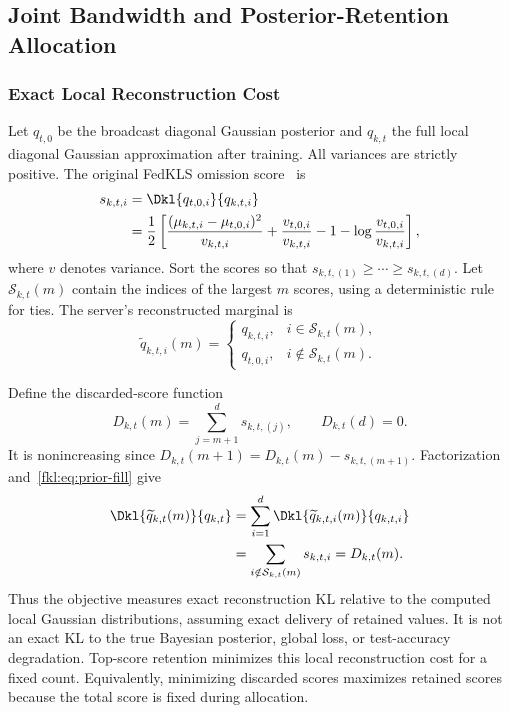 \subsection{Joint Bandwidth and Posterior-Retention Allocation}
\label{fkl:sec:problem}
\subsubsection{Exact Local Reconstruction Cost}
Let $q_{t,0}$ be the broadcast diagonal Gaussian posterior and $q_{k,t}$ the full local diagonal Gaussian approximation after training. All variances are strictly positive. The original FedKLS omission score~\cite[Sec.~II-A]{fedkls} is
\begin{align}
 s_{k,t,i}&=\Dkl{q_{t,0,i}}{q_{k,t,i}}\notag\\
 &=\frac{1}{2}\left[
 \frac{(\mu_{k,t,i}-\mu_{t,0,i})^2}{v_{k,t,i}}
 +\frac{v_{t,0,i}}{v_{k,t,i}}
 -1-\log\frac{v_{t,0,i}}{v_{k,t,i}}\right],
 \label{fkl:eq:score}
\end{align}
where $v$ denotes variance. Sort the scores so that $s_{k,t,(1)}\ge\cdots\ge s_{k,t,(d)}$. Let $\mathcal S_{k,t}(m)$ contain the indices of the largest $m$ scores, using a deterministic rule for ties. The server's reconstructed marginal is
\begin{equation}
 \widetilde q_{k,t,i}(m)=
 \begin{cases}
 q_{k,t,i},&i\in\mathcal S_{k,t}(m),\\
 q_{t,0,i},&i\notin\mathcal S_{k,t}(m).
 \end{cases}
 \label{fkl:eq:prior-fill}
\end{equation}

Define the discarded-score function
\begin{equation}
 D_{k,t}(m)=\sum_{j=m+1}^{d}s_{k,t,(j)},\qquad D_{k,t}(d)=0.
 \label{fkl:eq:discarded}
\end{equation}
It is nonincreasing since $D_{k,t}(m+1)=D_{k,t}(m)-s_{k,t,(m+1)}$. Factorization and~\eqref{fkl:eq:prior-fill} give
\begin{align}
 \Dkl{\widetilde q_{k,t}(m)}{q_{k,t}}
 &=\sum_{i=1}^{d}\Dkl{\widetilde q_{k,t,i}(m)}{q_{k,t,i}}\notag\\
 &=\sum_{i\notin\mathcal S_{k,t}(m)}s_{k,t,i}
 =D_{k,t}(m).
 \label{fkl:eq:exact-kl}
\end{align}
Thus the objective measures exact reconstruction KL relative to the computed local Gaussian distributions, assuming exact delivery of retained values. It is not an exact KL to the true Bayesian posterior, global loss, or test-accuracy degradation. Top-score retention minimizes this local reconstruction cost for a fixed count. Equivalently, minimizing discarded scores maximizes retained scores because the total score is fixed during allocation.

